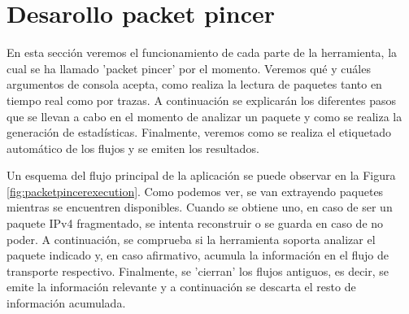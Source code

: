 \section{Desarollo packet pincer}

En esta sección veremos el funcionamiento de cada parte de la herramienta, la cual se ha llamado 'packet pincer' por el momento. Veremos qué y cuáles argumentos de consola acepta, como realiza la lectura de paquetes tanto en tiempo real como por trazas. A continuación se explicarán los diferentes pasos que se llevan a cabo en el momento de analizar un paquete y como se realiza la generación de estadísticas. Finalmente, veremos como se realiza el etiquetado automático de los flujos y se emiten los resultados.

Un esquema del flujo principal de la aplicación se puede observar en la Figura \ref{fig:packetpincerexecution}. Como podemos ver, se van extrayendo paquetes mientras se encuentren disponibles. Cuando se obtiene uno, en caso de ser un paquete IPv4 fragmentado, se intenta reconstruir o se guarda en caso de no poder. A continuación, se comprueba si la herramienta soporta analizar el paquete indicado y, en caso afirmativo, acumula la información en el flujo de transporte respectivo. Finalmente, se 'cierran' los flujos antiguos, es decir, se emite la información relevante y a continuación se descarta el resto de información acumulada.

